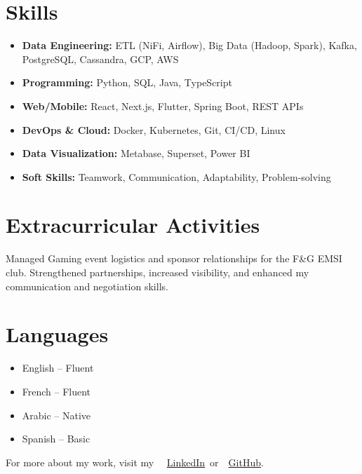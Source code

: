 \documentclass[10pt,a4paper,sans]{moderncv}
\begin{document}
\section{\fontsize{11.2}{13}\selectfont Skills}
\vspace{-6pt}
\begin{itemize}[leftmargin=0.3cm, itemsep=-2pt, topsep=0pt, partopsep=0pt, parsep=0pt]
    \item \textbf{Data Engineering:} ETL (NiFi, Airflow), Big Data (Hadoop, Spark), Kafka, PostgreSQL, Cassandra, GCP, AWS
    \item \textbf{Programming:} Python, SQL, Java, TypeScript
    \item \textbf{Web/Mobile:} React, Next.js, Flutter, Spring Boot, REST APIs
    \item \textbf{DevOps \& Cloud:} Docker, Kubernetes, Git, CI/CD, Linux
    \item \textbf{Data Visualization:} Metabase, Superset, Power BI
    \item \textbf{Soft Skills:} Teamwork, Communication, Adaptability, Problem-solving
\end{itemize}
\vspace{-17pt}
 \section{\fontsize{11.2}{13}\selectfont Extracurricular Activities}
\vspace{-7pt}
Managed Gaming event logistics and sponsor relationships for the F\&G EMSI club. Strengthened partnerships, increased visibility, and enhanced my communication and negotiation skills.


\vspace{-17pt}
\section{\fontsize{11.2}{13}\selectfont Languages}
\vspace{-17pt}
\begin{multicols}{2}
\begin{itemize}[leftmargin=0.3cm, itemsep=0pt, topsep=0pt, partopsep=0pt, parsep=0pt]
    \item English – Fluent
    \item French – Fluent
    \item Arabic – Native
    \item Spanish – Basic
\end{itemize}
\end{multicols}



\vspace{-20pt}
\begin{center}
    {\fontsize{9}{11}\selectfont\color{gray}
    For more about my work, visit my~
    \faLinkedin~\href{https://www.linkedin.com/in/ahmed-makroum/}{LinkedIn}~or~\faGithub~\href{https://github.com/ahmedmakroum}{GitHub}.}
\end{center}
\end{document}
